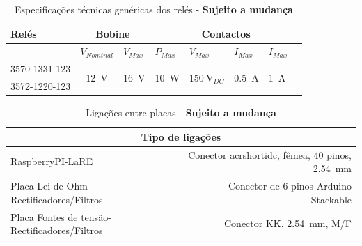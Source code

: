 \documentclass[a4paper,oneside,final,twocolumn]{article}
\begin{document}
\begin{table}[htb]
\caption{Especificações técnicas genéricas dos relés - \textbf{Sujeito a mudança}}
\centering
\begin{tabular}{lcclllll}
\toprule
Relés & \multicolumn{2}{c}{Bobine} & \multicolumn{5}{c}{Contactos}\\
\midrule
& \multicolumn{1}{l}{$V_{Nominal}$} & \multicolumn{1}{l}{$V_{Max}$} & $P_{Max}$ & $V_{Max}$ & $I_{Max}$ & $I_{Max}$\\
\midrule
3570-1331-123  & \multirow{2}{*}{\SI{12}{\volt}} & \multirow{2}{*}{\SI{16}{\volt}}  & \multirow{2}{*}{\SI{10}{\watt}} & \multirow{2}{*}{$\SI{150}{\volt}_{DC}$} & \multirow{2}{*}{\SI{0.5}{\ampere}} & \multirow{2}{*}{\SI{1}{\ampere}}\\
3572-1220-123 & & & & & & &\\                
\bottomrule
\end{tabular}%
\end{table}

\begin{table}[htb]
\caption{Ligações entre placas - \textbf{Sujeito a mudança}}
\centering
\begin{tabular}{lr}
\toprule
\multicolumn{2}{c}{Tipo de ligações}\\
\midrule
RaspberryPI-LaRE & Conector acrshort{idc}, fêmea, 40 pinos, \SI{2.54}{\mm}\\
Placa Lei de Ohm-Rectificadores/Filtros & Conector de 6 pinos Arduino Stackable\\
Placa Fontes de tensão-Rectificadores/Filtros &  Conector KK, \SI{2.54}{\mm}, M/F \\
\bottomrule
\end{tabular}
\end{table}
\raggedright

\newpage

\tableofcontents
\listoftables

\newpage
\end{document}
